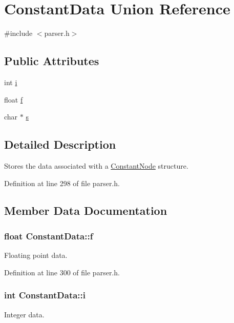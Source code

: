 \hypertarget{union_constant_data}{\section{Constant\-Data Union Reference}
\label{union_constant_data}
}


{\ttfamily \#include $<$parser.\-h$>$}

\subsection*{Public Attributes}
\begin{DoxyCompactItemize}
\item 
int \hyperlink{union_constant_data_a2bd6e6fb99485a02c81794d2a3fc5a41}{i}
\item 
float \hyperlink{union_constant_data_a9c3282f50d2b4fb9752bb55fed6d1ed2}{f}
\item 
char $\ast$ \hyperlink{union_constant_data_aee1ab22b8dd076717f5de146f8939b46}{s}
\end{DoxyCompactItemize}


\subsection{Detailed Description}
Stores the data associated with a \hyperlink{struct_constant_node}{Constant\-Node} structure. 

Definition at line 298 of file parser.\-h.



\subsection{Member Data Documentation}
\hypertarget{union_constant_data_a9c3282f50d2b4fb9752bb55fed6d1ed2}{
\subsubsection[{f}]{\setlength{\rightskip}{0pt plus 5cm}float {\bf Constant\-Data\-::f}}}\label{union_constant_data_a9c3282f50d2b4fb9752bb55fed6d1ed2}
Floating point data. 

Definition at line 300 of file parser.\-h.

\hypertarget{union_constant_data_a2bd6e6fb99485a02c81794d2a3fc5a41}{
\subsubsection[{i}]{\setlength{\rightskip}{0pt plus 5cm}int {\bf Constant\-Data\-::i}}}\label{union_constant_data_a2bd6e6fb99485a02c81794d2a3fc5a41}
Integer data. 

